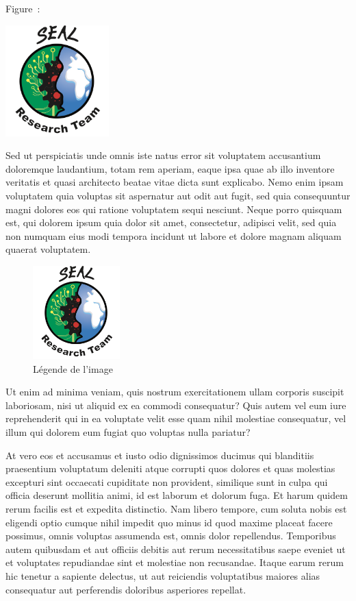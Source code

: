 Figure~:

\includegraphics[width=0.3\textwidth]{./img/logo_equipe_robotique_exploration}

Sed ut perspiciatis unde omnis iste natus error sit voluptatem accusantium doloremque laudantium, totam rem aperiam, eaque ipsa quae ab illo inventore veritatis et quasi architecto beatae vitae dicta sunt explicabo. Nemo enim ipsam voluptatem quia voluptas sit aspernatur aut odit aut fugit, sed quia consequuntur magni dolores eos qui ratione voluptatem sequi nesciunt. Neque porro quisquam est, qui dolorem ipsum quia dolor sit amet, consectetur, adipisci velit, sed quia non numquam eius modi tempora incidunt ut labore et dolore magnam aliquam quaerat voluptatem. 

\begin{figure}
\begin{center}
	\includegraphics[width=0.3\textwidth]{./img/logo_equipe_robotique_exploration}
	\caption{Légende de l'image}
	\label{fig:image1}
\end{center}
\end{figure}


Ut enim ad minima veniam, quis nostrum exercitationem ullam corporis suscipit laboriosam, nisi ut aliquid ex ea commodi consequatur? Quis autem vel eum iure reprehenderit qui in ea voluptate velit esse quam nihil molestiae consequatur, vel illum qui dolorem eum fugiat quo voluptas nulla pariatur?

At vero eos et accusamus et iusto odio dignissimos ducimus qui blanditiis praesentium voluptatum deleniti atque corrupti quos dolores et quas molestias excepturi sint occaecati cupiditate non provident, similique sunt in culpa qui officia deserunt mollitia animi, id est laborum et dolorum fuga. Et harum quidem rerum facilis est et expedita distinctio. Nam libero tempore, cum soluta nobis est eligendi optio cumque nihil impedit quo minus id quod maxime placeat facere possimus, omnis voluptas assumenda est, omnis dolor repellendus. Temporibus autem quibusdam et aut officiis debitis aut rerum necessitatibus saepe eveniet ut et voluptates repudiandae sint et molestiae non recusandae. Itaque earum rerum hic tenetur a sapiente delectus, ut aut reiciendis voluptatibus maiores alias consequatur aut perferendis doloribus asperiores repellat.
		
